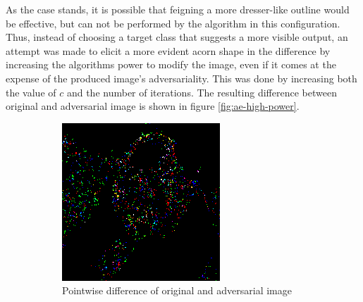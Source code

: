 \documentclass[11pt, a4paper]{article}
\begin{document}
As the case stands, it is possible that feigning a more dresser-like outline would be effective, but can not be performed by the algorithm in this configuration. Thus, instead of choosing a target class that suggests a more visible output, an attempt was made to elicit a more evident acorn shape in the difference by increasing the algorithms power to modify the image, even if it comes at the expense of the produced image's adversariality. This was done by increasing both the value of $c$ and the number of iterations. The resulting difference between original and adversarial image is shown in figure \ref{fig:ae-high-power}.

\begin{figure}[htp]
    \centering
    \begin{subfigure}[b]{0.45\textwidth}
        \includegraphics[width=\textwidth]{aes_new/panda_acorn_10_3dot0_posdiff.png}
        \caption{Pointwise difference of original and adversarial image}
        \label{fig:ae-high-power-img}
    \end{subfigure}
    ~ %
    \begin{subfigure}[b]{0.45\textwidth}

\end{subfigure}
\end{figure}
\end{document}
